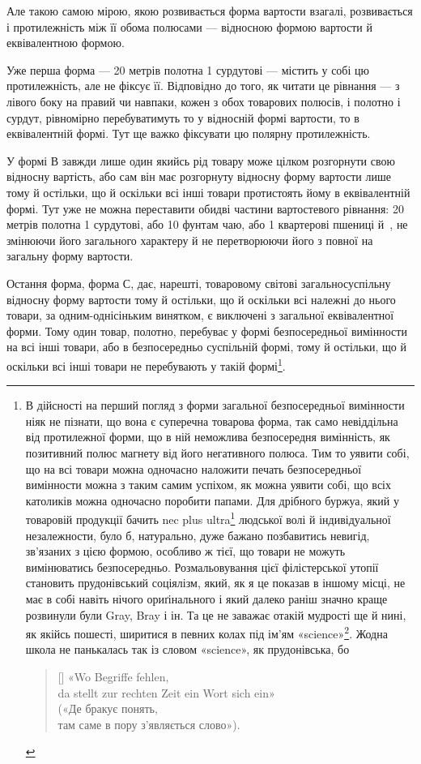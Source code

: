 Але такою самою мірою, якою розвивається форма вартости
взагалі, розвивається і протилежність між її обома полюсами —
відносною формою вартости й еквівалентною формою.

Уже перша форма — 20 метрів полотна \deq{} 1 сурдутові —
містить у собі цю протилежність, але не фіксує її. Відповідно до
того, як читати це рівнання — з лівого боку на правий чи навпаки,
кожен з обох товарових полюсів, і полотно і сурдут, рівномірно
перебуватимуть то у відносній формі вартости, то в еквівалентній
формі. Тут ще важко фіксувати цю полярну протилежність.

У формі В завжди лише один якийсь рід товару може цілком
розгорнути свою відносну вартість, або сам він має розгорнуту
відносну форму вартости лише тому й остільки, що й оскільки
всі інші товари протистоять йому в еквівалентній формі. Тут уже
не можна переставити обидві частини вартостевого рівнання: 20 метрів
полотна \deq{} 1 сурдутові, або \deq{} 10 фунтам чаю, або \deq{} 1 квартерові
пшениці й~, не змінюючи його загального характеру
й не перетворюючи його з повної на загальну форму вартости.

Остання форма, форма С, дає, нарешті, товаровому світові
загальносуспільну відносну форму вартости тому й остільки,
що й оскільки всі належні до нього товари, за одним-однісіньким
винятком, є виключені з загальної еквівалентної форми. Тому
один товар, полотно, перебуває у формі безпосередньої вимінности
на всі інші товари, або в безпосередньо суспільній формі, тому
й остільки, що й оскільки всі інші товари не перебувають у такій
формі\footnote{
В дійсності на перший погляд з форми загальної безпосередньої
вимінности ніяк не пізнати, що вона є суперечна товарова форма, так
само невіддільна від протилежної форми, що в ній неможлива безпосередня
вимінність, як позитивний полюс магнету від його негативного полюса.
Тим то уявити собі, що на всі товари можна одночасно наложити печать
безпосередньої вимінности можна з таким самим успіхом, як можна
уявити собі, що всіх католиків можна одночасно поробити папами. Для
дрібного буржуа, який у товаровій продукції бачить nec plus ultra\footnote*{
— вершину. \emph{Ред}} людської волі й індивідуальної незалежности, було б, натурально, дуже
бажано позбавитись невигід, зв’язаних з цією формою, особливо ж тієї, що
товари не можуть вимінюватись безпосередньо. Розмальовування цієї філістерської
утопії становить прудонівський соціялізм, який, як я це показав
в іншому місці, не має в собі навіть нічого ориґінального і який далеко
раніш значно краще розвинули були Gray, Bray і ін. Та це не заважає
отакій мудрості ще й нині, як якійсь пошесті, ширитися в певних колах
під ім’ям «science»\footnote*{— «наука». \emph{Ред.}}.
Жодна школа не панькалась так із словом «science», як прудонівська, бо
\settowidth{\versewidth}{da stellt zur rechten Zeit ein Wort sich ein»}
\begin{verse}[\versewidth]
«Wo Begriffe fehlen,\\
da stellt zur rechten Zeit ein Wort sich ein»\\
\smalskip
(«Де бракує понять,\\
там саме в пору з’являється слово»).
\end{verse}}.

